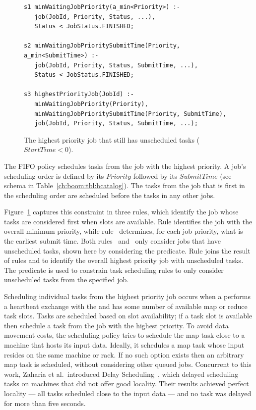 \begin{figure}
\label{fig:joborder}
\ssp
\centering
\begin{lstlisting}
s1 minWaitingJobPriority(a_min<Priority>) :-
   job(JobId, Priority, Status, ...),
   Status < JobStatus.FINISHED;
	
s2 minWaitingJobPrioritySubmitTime(Priority, a_min<SubmitTime>) :-
   job(JobId, Priority, Status, SubmitTime, ...),
   Status < JobStatus.FINISHED;

s3 highestPriorityJob(JobId) :-
   minWaitingJobPriority(Priority),
   minWaitingJobPrioritySubmitTime(Priority, SubmitTime),
   job(JobId, Priority, Status, SubmitTime, ...);
\end{lstlisting}
\caption{\label{ch:boom:fig:joborder}The highest priority job that still has unscheduled tasks ($StartTime < 0$).}
\end{figure}

The FIFO policy schedules tasks from the job with the highest priority.  A
job's scheduling order is defined by its $Priority$ followed by its
$SubmitTime$ (see  schema in Table~\ref{ch:boom:tbl:hcatalog}).  The
tasks from the job that is first in the scheduling order are scheduled before
the tasks in any other jobs.

Figure~\ref{ch:boom:fig:joborder} captures this constraint in three rules,
which identify the job whose tasks are considered first when \TT slots are
available.  Rule  identifies the job with the overall minimum priority,
while rule~ determines, for each job priority, what is the earliest
submit time.  Both rules~ and~ only consider jobs that have unscheduled
tasks, shown here by considering the 
predicate.  Rule  joins the result of rules  and  to
identify the overall highest priority job with unscheduled tasks.  The
 predicate is used to constrain task scheduling rules
to only consider unscheduled tasks from the specified job.

Scheduling individual tasks from the highest priority job occurs when a \TT
performs a heartbeat exchange with the \JT and has some number of available map
or reduce task slots.  Tasks are scheduled based on slot availability; if a
task slot is available then schedule a task from the job with the highest
priority.  To avoid data movement costs, the scheduling policy tries to
schedule the map task close to a machine that hosts its input data.  Ideally,
it schedules a map task whose input resides on the same machine or rack.  If no
such option exists then an arbitrary map task is scheduled, without considering
other queued jobs.  Concurrent to this work, Zaharia et al.\ introduced Delay
Scheduling~\cite{delay-sched}, which delayed scheduling tasks on machines that
did not offer good locality.  Their results achieved perfect locality --- all
tasks scheduled close to the input data --- and no task was delayed for more than
five seconds.

